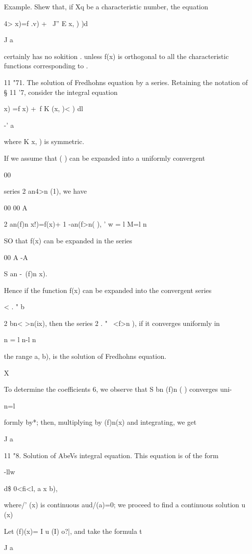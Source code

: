 {Example. Shew that, if Xq be a characteristic number, the equation

4> x)=f .v) + \ J'' E x, ) )d

J a

certainly has no sokition . unless f(x) is orthogonal to all the
characteristic functions corresponding to .

11 "71. The solution of Fredhohns equation by a series. Retaining the
notation of § 11 '7, consider the integral equation

   x) =f x) +\ f K (x, )< ) dl

-' a

where K x, ) is symmetric.

If we assume that ( ) can be expanded into a uniformly convergent

00

series 2 an4>n (1), we have

00 00 A

2 an(f)n x!)=f(x)+ 1 -an(f>n( ), ' w = l M=l n

SO that f(x) can be expanded in the series

00 A -A

S an -\ (f)n x).

Hence if the function f(x) can be expanded into the convergent series

< . " b \

2 bn< >n(ix), then the series 2 . " \ <f>n ), if it converges
uniformly in

n = l n-l n

the range a, b), is the solution of Fredhohns equation.

%
%

X

To determine the coefficients 6, we observe that S bn (f)n ( )
converges uni-

n=l

formly by*; then, multiplying by (f)n(x) and integrating, we
get

J a

11 "8. Solution of AbeVs integral equation. This equation is of the
form

  -llw

d\$ 0<fi<l, a x b),

where/' (x) is continuous aud/(a)=0; we proceed to find a continuous
solution u (x)

Let (f)(x)= I u (I) o?|, and take the formula t

J a

}
